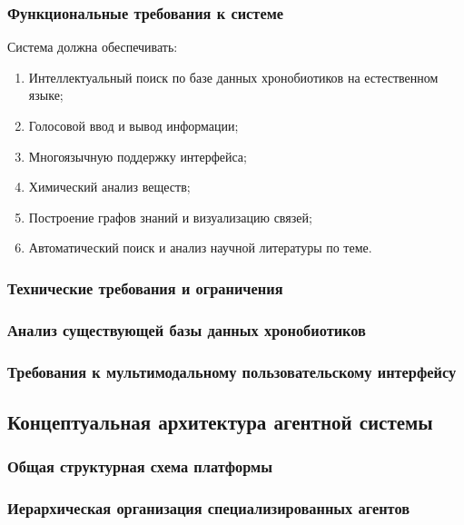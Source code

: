 \documentclass{syksu-coursework}
\begin{document}
\subsubsection{Функциональные требования к системе}

Система должна обеспечивать:

\begin{enumerate}
    \item Интеллектуальный поиск по базе данных хронобиотиков на естественном языке;
    \item Голосовой ввод и вывод информации;
    \item Многоязычную поддержку интерфейса;
    \item Химический анализ веществ;
    \item Построение графов знаний и визуализацию связей;
    \item Автоматический поиск и анализ научной литературы по теме.
\end{enumerate}

\subsubsection{Технические требования и ограничения}

\subsubsection{Анализ существующей базы данных хронобиотиков}

\subsubsection{Требования к мультимодальному пользовательскому интерфейсу}

\subsection{Концептуальная архитектура агентной системы}

\subsubsection{Общая структурная схема платформы}

\subsubsection{Иерархическая организация специализированных агентов}
\end{document}
